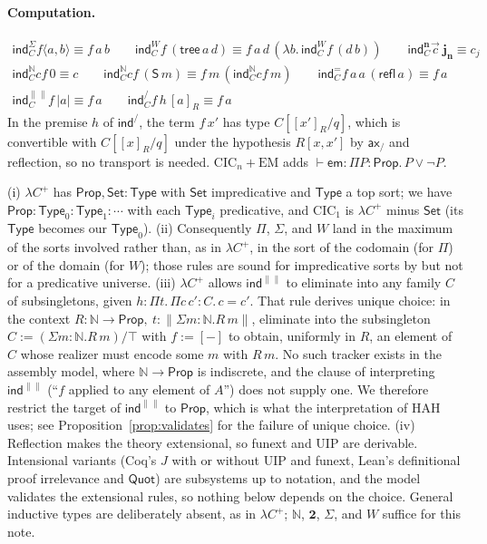 \documentclass[10pt]{article}
\newcommand{\N}{\mathbb{N}}
\newcommand{\Prop}{\mathsf{Prop}}
\newcommand{\Type}{\mathsf{Type}}
\newcommand{\Set}{\mathsf{Set}}
\newcommand{\CIC}{\mathrm{CIC}}
\newcommand{\HAH}{\mathrm{HAH}}
\newcommand{\EM}{\mathrm{EM}}
\begin{document}
\paragraph{Computation.}
\begin{gather*}
\mathsf{ind}^\Sigma_C f\langle a,b\rangle\equiv f\,a\,b\qquad
\mathsf{ind}^W_C f\,(\mathsf{tree}\,a\,d)\equiv f\,a\,d\,(\lambda b.\,\mathsf{ind}^W_C f\,(d\,b))\qquad
\mathsf{ind}^{\mathbf n}_C\vec c\ \mathbf j_{\mathbf n}\equiv c_j\\
\mathsf{ind}^\N_C c f\,0\equiv c\qquad
\mathsf{ind}^\N_C c f\,(\mathsf S\,m)\equiv f\,m\,(\mathsf{ind}^\N_C c f\,m)\qquad
\mathsf{ind}^=_C f\,a\,a\,(\mathsf{refl}\,a)\equiv f\,a\\
\mathsf{ind}^{\|\|}_C f\,|a|\equiv f\,a\qquad
\mathsf{ind}^/_C f\,h\,[a]_R\equiv f\,a
\end{gather*}
In the premise $h$ of $\mathsf{ind}^/$, the term $f\,x'$ has type
$C[[x']_R/q]$, which is convertible with $C[[x]_R/q]$ under the hypothesis
$R[x,x']$ by $\mathsf{ax}_/$ and reflection, so no transport is needed.
$\CIC_n+\EM$ adds $\vdash\mathsf{em}:\Pi P{:}\Prop.\,P\vee\neg P$.

\begin{remark}\label{rem:diff}
(i) $\lambda C^+$ has $\Prop,\Set:\Type$ with $\Set$ impredicative and
$\Type$ a top sort; we have $\Prop:\Type_0:\Type_1:\cdots$ with each
$\Type_i$ predicative, and $\CIC_1$ is $\lambda C^+$ minus $\Set$ (its
$\Type$ becomes our $\Type_0$).
(ii) Consequently $\Pi$, $\Sigma$, and $W$ land in the maximum of the sorts
involved rather than, as in $\lambda C^+$, in the sort of the codomain
(for $\Pi$) or of the domain (for $W$); those rules are sound for
impredicative sorts by \cite[Prop.~7]{vdbergotten23} but not for a
predicative universe.
(iii) $\lambda C^+$ allows $\mathsf{ind}^{\|\|}$ to eliminate into any
family $C$ of subsingletons, given $h:\Pi t.\,\Pi c\,c'{:}C.\,c=c'$. That
rule derives unique choice: in the context $R{:}\N\to\Prop,\
t{:}\|\Sigma m{:}\N.R\,m\|$, eliminate into the subsingleton
$C:=(\Sigma m{:}\N.R\,m)/\top$ with $f:=[{-}]$ to obtain, uniformly in $R$,
an element of $C$ whose realizer must encode some $m$ with $R\,m$. No such
tracker exists in the assembly model, where $\N\to\Prop$ is indiscrete,
and the clause of \cite[App.~B]{vdbergotten23} interpreting
$\mathsf{ind}^{\|\|}$ (``$f$ applied to any element of $A$'') does not
supply one. We therefore restrict the target of $\mathsf{ind}^{\|\|}$ to
$\Prop$, which is what the interpretation of $\HAH$ uses; see
Proposition~\ref{prop:validates} for the failure of unique choice.
(iv) Reflection makes the theory extensional, so funext and UIP are
derivable. Intensional variants (Coq's $J$ with or without UIP and funext,
Lean's definitional proof irrelevance and $\mathsf{Quot}$) are subsystems
up to notation, and the model validates the extensional rules, so nothing
below depends on the choice. General inductive types are deliberately
absent, as in $\lambda C^+$; $\N$, $\mathbf 2$, $\Sigma$, and $W$ suffice
for this note.
\end{remark}
\end{document}
